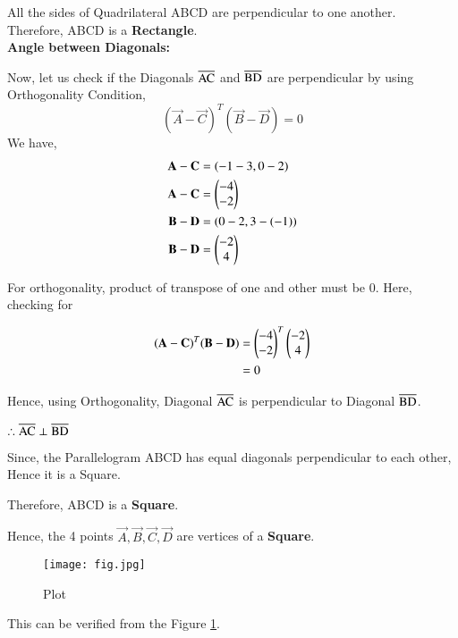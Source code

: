 \documentclass[journal,12pt,twocolumn]{IEEEtran}
\begin{document}
All the sides of Quadrilateral ABCD are perpendicular to one another. \\

Therefore, ABCD is a \textbf{Rectangle}. \\

\textbf{Angle between Diagonals:}

Now, let us check if the Diagonals $\overline{\rm AC}$ and $\overline{\rm BD}$ are perpendicular by using Orthogonality Condition,
\begin{equation}
    (\vec{A} - \vec{C})^T(\vec{B} - \vec{D}) = 0
\end{equation}
We have,
\begin{align}
 \mathbf{A} - \mathbf{C} &= (-1-3, 0-2) \\
 \mathbf{A} - \mathbf{C} &= \begin{pmatrix}-4\\-2\end{pmatrix} \\
 \mathbf{B} - \mathbf{D} &= (0-2, 3-(-1)) \\
 \mathbf{B} - \mathbf{D} &= \begin{pmatrix}-2\\4\end{pmatrix}
\end{align}

For orthogonality, product of transpose of one and other must be 0. Here, checking for

\begin{align}
    (\mathbf{A} - \mathbf{C})^T(\mathbf{B} - \mathbf{D}) &= \begin{pmatrix}-4\\-2\end{pmatrix}^T\begin{pmatrix}-2\\4\end{pmatrix} \\
    &= 0
\end{align}

Hence, using Orthogonality, Diagonal $\overline{\rm AC}$ is perpendicular to Diagonal $\overline{\rm BD}$.

$\therefore \overline{\rm AC} \perp \overline{\rm BD}$

Since, the Parallelogram ABCD has equal diagonals perpendicular to each other, Hence it is a Square.

Therefore, ABCD is a \textbf{Square}.

Hence, the 4 points $\vec{A},\vec{B},\vec{C},\vec{D}$ are vertices of a \textbf{Square}. 

\begin{figure}[htp]
    \centering
    \texttt{[image: fig.jpg]}
    \caption{Plot}
    \label{fig:label}
\end{figure}
This can be verified from the Figure \ref{fig:label}.
\end{document}

